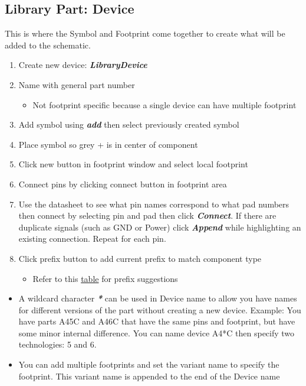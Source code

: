 \documentclass{article}
\begin{document}
\subsection{Library Part: Device}
This is where the Symbol and Footprint come together to create what will be added to the schematic.
\begin{enumerate}
    \item Create new device: \textit{\textbf{Library\textrightarrow Device}}
    \item Name with general part number
    \begin{itemize}
        \item Not footprint specific because a single device can have multiple footprint
    \end{itemize}
    \item Add symbol using \textit{\textbf{add}} then select previously created symbol
    \item Place symbol so grey + is in center of component
    \item Click new button in footprint window and select local footprint
    \item Connect pins by clicking connect button in footprint area
    \item Use the datasheet to see what pin names correspond to what pad numbers then connect by selecting pin and pad then click \textit{\textbf{Connect}}. If there are duplicate signals (such as GND or Power) click \textit{\textbf{Append}} while highlighting an existing connection. Repeat for each pin.
    \item Click prefix button to add current prefix to match component type
        \begin{itemize}
            \item Refer to this \href{https://wiki.robojackets.org/EAGLE_Style_Guide#Prefix}{table} for prefix suggestions
        \end{itemize}
\end{enumerate}
\begin{tcolorbox} [title=Tips \& Tricks]
    \begin{itemize}
        \item A wildcard character \textit{\textbf{*}} can be used in Device name to allow you have names for different versions of the part without creating a new device. Example: You have parts A45C and A46C that have the same pins and footprint, but have some minor internal difference. You can name device A4*C then specify two technologies: 5 and 6.
        \item You can add multiple footprints and set the variant name to specify the footprint. This variant name is appended to the end of the Device name
    \end{itemize}
\end{tcolorbox}
\end{document}
